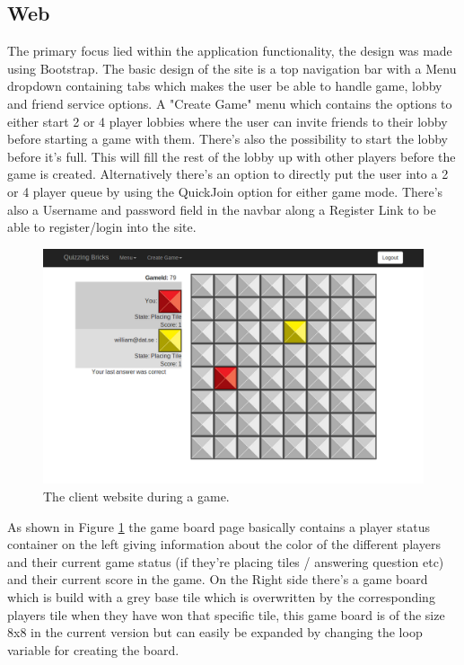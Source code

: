 \subsection{Web}
The primary focus lied within the application functionality, the design was made using Bootstrap\cite{ref_bootstrap}. 
The basic design of the site is a top navigation bar with a Menu dropdown containing tabs which makes the user be able to handle game, lobby and friend service options. A "Create Game" menu which contains the options to either start 2 or 4 player lobbies where the user can invite friends to their lobby before starting a game with them. There's also the possibility to start the lobby before it's full. This will fill the rest of the lobby up with other players before the game is created. Alternatively there's an option to directly put the user into a 2 or 4 player queue by using the QuickJoin option for either game mode. There's also a Username and password field in the navbar along a Register Link to be able to register/login into the site.

\begin{figure}[H]
	\centering
	\includegraphics[width=\textwidth,height=\textheight,keepaspectratio=true]{img/game_board_page.png}
	\caption{The client website during a game.}
	\label{fig:web}
\end{figure}

As shown in Figure \ref{fig:web} the game board page basically contains a player status container on the left giving information about the color of the different players and their current game status (if they're placing tiles / answering question etc) and their current score in the game. On the Right side there's  a game board which is build with a grey base tile which is overwritten by the corresponding players tile when they have won that specific tile, this game board is of the size 8x8 in the current version but can easily be expanded by changing the loop variable for creating the board.

